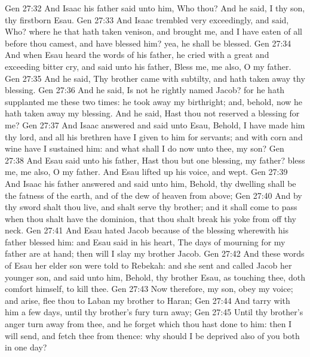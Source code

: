 \vs Gen 27:32 And Isaac his father said unto him, Who  thou? And he said, I  thy son, thy firstborn Esau.
\vs Gen 27:33 And Isaac trembled very exceedingly, and said, Who? where  he that hath taken venison, and brought  me, and I have eaten of all before thou camest, and have blessed him? yea,  he shall be blessed.
\vs Gen 27:34 And when Esau heard the words of his father, he cried with a great and exceeding bitter cry, and said unto his father, Bless me,  me also, O my father.
\vs Gen 27:35 And he said, Thy brother came with subtilty, and hath taken away thy blessing.
\vs Gen 27:36 And he said, Is not he rightly named Jacob? for he hath supplanted me these two times: he took away my birthright; and, behold, now he hath taken away my blessing. And he said, Hast thou not reserved a blessing for me?
\vs Gen 27:37 And Isaac answered and said unto Esau, Behold, I have made him thy lord, and all his brethren have I given to him for servants; and with corn and wine have I sustained him: and what shall I do now unto thee, my son?
\vs Gen 27:38 And Esau said unto his father, Hast thou but one blessing, my father? bless me,  me also, O my father. And Esau lifted up his voice, and wept.
\vs Gen 27:39 And Isaac his father answered and said unto him, Behold, thy dwelling shall be the fatness of the earth, and of the dew of heaven from above;
\vs Gen 27:40 And by thy sword shalt thou live, and shalt serve thy brother; and it shall come to pass when thou shalt have the dominion, that thou shalt break his yoke from off thy neck.
\vs Gen 27:41 And Esau hated Jacob because of the blessing wherewith his father blessed him: and Esau said in his heart, The days of mourning for my father are at hand; then will I slay my brother Jacob.
\vs Gen 27:42 And these words of Esau her elder son were told to Rebekah: and she sent and called Jacob her younger son, and said unto him, Behold, thy brother Esau, as touching thee, doth comfort himself,  to kill thee.
\vs Gen 27:43 Now therefore, my son, obey my voice; and arise, flee thou to Laban my brother to Haran;
\vs Gen 27:44 And tarry with him a few days, until thy brother's fury turn away;
\vs Gen 27:45 Until thy brother's anger turn away from thee, and he forget  which thou hast done to him: then I will send, and fetch thee from thence: why should I be deprived also of you both in one day?
